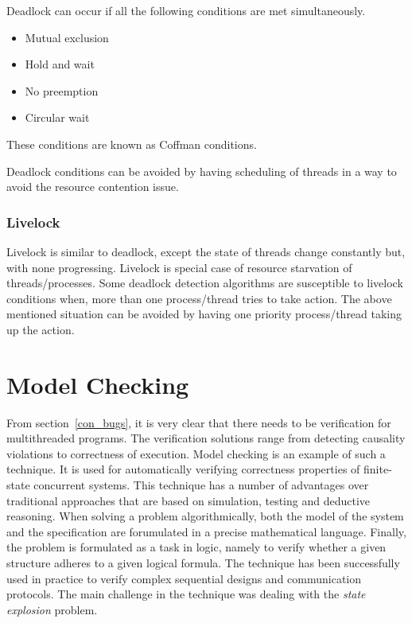Deadlock can occur if all the following conditions are met simultaneously.

\begin{itemize}
\item	Mutual exclusion
\item	Hold and wait
\item	No preemption
\item	Circular wait
\end{itemize}

These conditions are known as Coffman conditions\cite{coffman_cond}.

Deadlock conditions can be avoided by having scheduling of threads in a way to avoid the resource contention issue.

\subsubsection{Livelock}

Livelock is similar to deadlock, except the state of threads change constantly but, with none progressing. 
Livelock is special case of resource starvation of threads/processes. 
Some deadlock detection algorithms are susceptible to livelock conditions when, more than one process/thread tries to take action\cite{lopez2017study}\cite{chaki2005concurrent}. 
The above mentioned situation can be avoided by having one priority process/thread taking up the action. 

\section{Model Checking}

From section~\ref{con_bugs}, it is very clear that there needs to be verification for multithreaded programs. 
The verification solutions range from detecting causality violations to correctness of execution\cite{d2008survey}. 
Model checking is an example of such a technique. 
It is used for automatically verifying correctness properties of finite-state concurrent systems\cite{model_check}\cite{berard2013systems}. 
This technique has a number of advantages over traditional approaches that are based on simulation, testing and deductive reasoning. 
When solving a problem algorithmically, both the model of the system and the specification are forumulated in a precise mathematical language. 
Finally, the problem is formulated as a task in logic, namely to verify whether a given structure adheres to a given logical formula.  
The technique has been successfully used in practice to verify complex sequential designs and communication protocols\cite{model_check}. 
The main challenge in the technique was dealing with the \emph{state explosion} problem.



